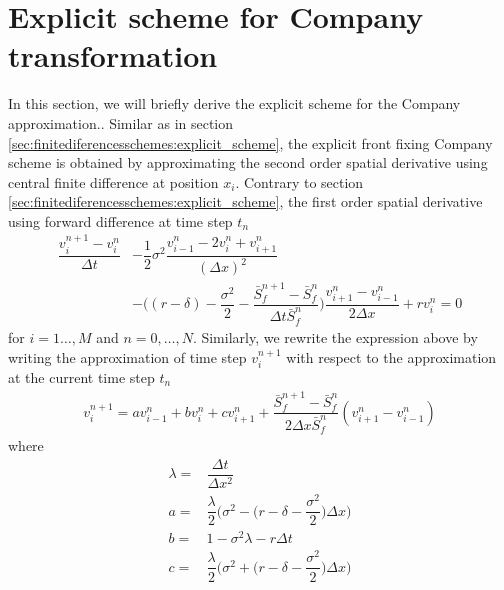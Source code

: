 
\section{Explicit scheme for Company transformation} \label{sec:company_explicit_scheme}
In this section, we will briefly derive the explicit scheme for the Company approximation.\cite{company_egorova_jodar_2014}. Similar as in section \ref{sec:finitediferencesschemes:explicit_scheme}, the explicit front fixing Company scheme is obtained by approximating the second order spatial derivative using central finite difference at position $x_i$. Contrary to section \ref{sec:finitediferencesschemes:explicit_scheme},  the first order spatial derivative using forward difference at time step $t_n$
\begin{equation*}
    \begin{split}
      \dfrac{v^{n+1}_{i} - v^{n}_{i}}{\Delta{t}} & - \dfrac{1}{2}\sigma^2 \dfrac{v^{n}_{i-1} - 2v^{n}_{i} + v^{n}_{i+1}}{(\Delta{x})^2} \\ 
       & - \bigg( (r-\delta) - \dfrac{\sigma^2}{2} - \dfrac{\bar{S}^{n+1}_{f} - \bar{S}^{n}_{f}}{\Delta{t}\bar{S}^{n}_{f}} \bigg)\dfrac{v^{n}_{i+1} - v^{n}_{i-1}}{2\Delta{x}} + rv^{n}_{i} = 0
    \end{split}
\end{equation*}
for $i=1\dots,M$ and $n = 0,\dots,N$. Similarly, we rewrite the expression above by writing the approximation of time step $v^{n+1}_i$ with respect to the approximation at the current time step $t_{n}$
\begin{equation}
    \label{eq:appendix:comapany:explicit_scheme}
    \begin{split}
        v^{n+1}_{i} = av^{n}_{i-1} + bv^{n}_{i} + cv^{n}_{i+1} + \dfrac{\bar{S}^{n+1}_{f} - \bar{S}^{n}_{f}}{2\Delta{x}\bar{S}^{n}_{f}}(v^{n}_{i+1} - v^{n}_{i-1})
    \end{split}
\end{equation}
where 
\begin{equation}
    \label{eq:appendix:comapany:explicit_scheme_terms}
    \begin{split}
        \lambda =& \dfrac{\Delta{t}}{\Delta{x}^2}\\
        a =& \dfrac{\lambda}{2}\bigg( \sigma^2 - \bigg(r - \delta - \dfrac{\sigma^2}{2}\bigg)\Delta{x} \bigg) \\
        b =& 1 - \sigma^2\lambda- r\Delta{t} \\
        c =& \dfrac{\lambda}{2}\bigg(\sigma^2 + \bigg(r - \delta - \dfrac{\sigma^2}{2}\bigg)\Delta{x}\bigg)
    \end{split}
\end{equation}
